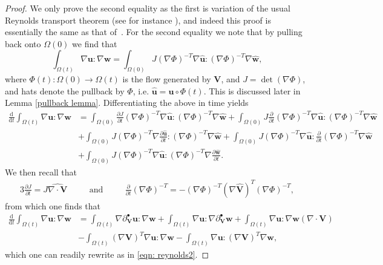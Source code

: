 \documentclass[a4paper]{amsart}
\numberwithin{equation}{section}
\newcommand{\ddt}[1]{\frac{\partial #1}{\partial t}}
\newcommand{\matdev}{\partial^{\bullet}}
\newcommand{\grad}{\nabla}
\newcommand{\Div}{\nabla \cdot}
\theoremstyle{plain}
\newcommand{\mbf}[1]{\mathbf{#1}}
\begin{document}
\begin{proof}
    We only prove the second equality as the first is variation of the usual Reynolds transport theorem (see for instance \cite{gurtin1982introduction}), and indeed this proof is essentially the same as that of~\cite[Lemma 5.2]{Dziuk2013SurfaceFEM}.
    For the second equality we note that by pulling back onto $\Omega(0)$ we find that
    \[ \int_{\Omega(t)} \grad\mbf{u} : \grad\mbf{w} = \int_{\Omega(0)}J (\grad \Phi)^{-T}\grad\widehat{\mbf{u}} : (\grad \Phi)^{-T}\grad\widehat{\mbf{w}}, \]
    where $\Phi(t) : \Omega(0) \rightarrow \Omega(t)$ is the flow generated by $\mbf{V}$, and $J = \det(\grad \Phi)$, and hats denote the pullback by $\Phi$, i.e. $\widehat{\mbf{u}} = \mbf{u}\circ \Phi(t)$.
    This is discussed later in Lemma \ref{pullback lemma}.
    Differentiating the above in time yields
    \begin{align*}
        \frac{\mathrm{d}}{\mathrm{d}t}\int_{\Omega(t)} \grad\mbf{u} : \grad\mbf{w} &= \int_{\Omega(0)}\ddt{J} (\grad \Phi)^{-T}\grad\widehat{\mbf{u}} : (\grad \Phi)^{-T}\grad\widehat{\mbf{w}} + \int_{\Omega(0)}J \ddt{}(\grad \Phi)^{-T}\grad\widehat{\mbf{u}} : (\grad \Phi)^{-T}\grad\widehat{\mbf{w}}\\
        &+ \int_{\Omega(0)}J (\grad \Phi)^{-T}\grad\ddt{\widehat{\mbf{u}}} : (\grad \Phi)^{-T}\grad\widehat{\mbf{w}} + \int_{\Omega(0)}J (\grad \Phi)^{-T}\grad\widehat{\mbf{u}} : \ddt{}(\grad \Phi)^{-T}\grad\widehat{\mbf{w}}\\
        &+ \int_{\Omega(0)}J (\grad \Phi)^{-T}\grad\widehat{\mbf{u}} : (\grad \Phi)^{-T}\grad\ddt{\widehat{\mbf{w}}}.
    \end{align*}
    We then recall that 
    \begin{alignat*}{3}
        \ddt{J} = J \widehat{\Div \mbf{V}} && \quad \text{and} \quad && \ddt{} (\grad \Phi)^{-T} = - (\grad \Phi)^{-T}(\grad \widehat{\mbf{V}})^T (\grad \Phi)^{-T},
    \end{alignat*}
    from which one finds that
    \begin{align*}
        \frac{\mathrm{d}}{\mathrm{d}t}\int_{\Omega(t)} \grad\mbf{u} : \grad\mbf{w} &= \int_{\Omega(t)} \grad\matdev_{\mbf{V}}{\mbf{u}} : \grad \mbf{w} + \int_{\Omega(t)} \grad \mbf{u} : \grad \matdev_{\mbf{V}}\mbf{w} + \int_{\Omega(t)} \grad\mbf{u} : \grad\mbf{w} (\Div \mbf{V})\\
        &- \int_{\Omega(t)} (\grad \mbf{V})^T \grad\mbf{u} : \grad\mbf{w} - \int_{\Omega(t)} \grad\mbf{u} : (\grad \mbf{V})^T\grad\mbf{w},
    \end{align*}
    which one can readily rewrite as in \eqref{eqn: reynolds2}.
\end{proof}
\end{document}
